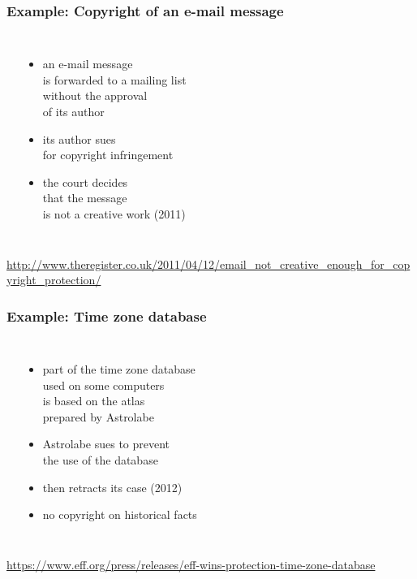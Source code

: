 \documentclass[dvipsnames]{beamer}
\theoremstyle{plain}
\begin{document}
\begin{frame}
  \frametitle{Example: Copyright of an e-mail message}

  \begin{columns}
    \begin{center}
    \end{center}

    \begin{itemize}
      \item an e-mail message\\
        is forwarded to a mailing list\\
        without the approval\\
        of its author
      \item its author sues\\
        for copyright infringement
      \item the court decides\\
        that the message\\
        is not a creative work (2011)
    \end{itemize}
  \end{columns}

  \medskip
  \tiny{\url{http://www.theregister.co.uk/2011/04/12/email_not_creative_enough_for_copyright_protection/}}\\
\end{frame}

\begin{frame}
  \frametitle{Example: Time zone database}

  \begin{columns}
    \begin{center}
    \end{center}

    \begin{itemize}
      \item part of the time zone database\\
        used on some computers\\
        is based on the atlas\\
        prepared by Astrolabe
      \item Astrolabe sues to prevent\\
        the use of the database
      \item then retracts its case (2012)
      \item no copyright on historical facts
    \end{itemize}
  \end{columns}

  \medskip
  \tiny{\url{https://www.eff.org/press/releases/eff-wins-protection-time-zone-database}}\\
\end{frame}
\end{document}
